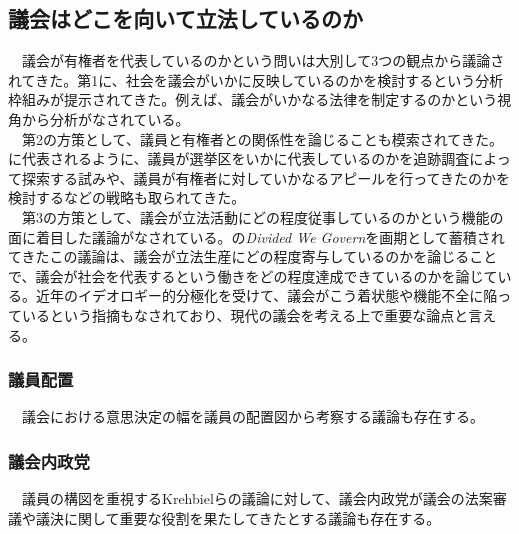 \subsection{議会はどこを向いて立法しているのか}
　議会が有権者を代表しているのかという問いは大別して3つの観点から議論されてきた。第1に、社会を議会がいかに反映しているのかを検討するという分析枠組みが提示されてきた。例えば、議会がいかなる法律を制定するのかという視角から分析がなされている。\\
　第2の方策として、議員と有権者との関係性を論じることも模索されてきた。\citet*{Fenno1977-se,Fenno2000-up}に代表されるように、議員が選挙区をいかに代表しているのかを追跡調査によって探索する試みや、議員が有権者に対していかなるアピールを行ってきたのかを検討するなどの戦略も取られてきた。\\
　第3の方策として、議会が立法活動にどの程度従事しているのかという機能の面に着目した議論がなされている。\citet*{Mayhew1991-rq,Mayhew2005-or}の\textit{Divided We Govern}を画期として蓄積されてきたこの議論は、議会が立法生産にどの程度寄与しているのかを論じることで、議会が社会を代表するという働きをどの程度達成できているのかを論じている。近年のイデオロギー的分極化を受けて、議会がこう着状態や機能不全に陥っているという指摘もなされており、現代の議会を考える上で重要な論点と言える。\\

\subsubsection{議員配置}
　議会における意思決定の幅を議員の配置図から考察する議論も存在する。\citep*{Krehbiel2010-ob,Tsebelis2009-hf}
\subsubsection{議会内政党}
　議員の構図を重視するKrehbielらの議論に対して、議会内政党が議会の法案審議や議決に関して重要な役割を果たしてきたとする議論も存在する。\citep*{Cox2005-pn,Cox2007-xq,Rohde1991-da,Aldrich1995-xf}\\
